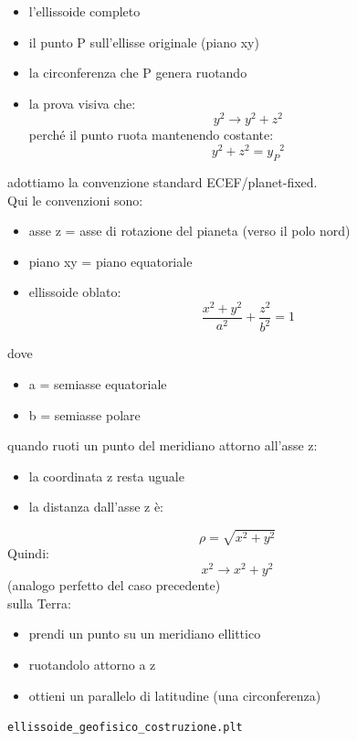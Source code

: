 \documentclass[a4paper,14pt]{article}
\begin{document}
\begin{itemize}
\item l’ellissoide completo
\item il punto  P sull’ellisse originale (piano xy)
\item la circonferenza che P genera ruotando
\item la prova visiva che:
\[y^2\rightarrow y^2+z^2\]
perché il punto ruota mantenendo costante:\\
\[y^2+z^2={y_P}^2\]
\end{itemize}
adottiamo la convenzione standard ECEF/planet-fixed.\\
Qui le convenzioni sono:
\begin{itemize}
\item asse z = asse di rotazione del pianeta (verso il polo nord)
\item piano xy = piano equatoriale
\item ellissoide oblato:
\[\frac{x^2+y^2}{a^2}+\frac{z^2}{b^2}=1\]
\end{itemize}
dove\\
\begin{itemize}
\item a = semiasse equatoriale
\item b = semiasse polare
\end{itemize}
quando ruoti un punto del meridiano attorno all’asse z:
\begin{itemize}
\item la coordinata z resta uguale
\item la distanza dall’asse z è:
\end{itemize}
\[\rho=\sqrt{x^2+y^2}\]
Quindi:
\[x^2\rightarrow x^2+y^2\]
(analogo perfetto del caso precedente)\\
sulla Terra:
\begin{itemize}
\item prendi un punto su un meridiano ellittico
\item ruotandolo attorno a z
\item ottieni un parallelo di latitudine (una circonferenza)
\end{itemize}
\verb|ellissoide_geofisico_costruzione.plt| \\
\end{document}
